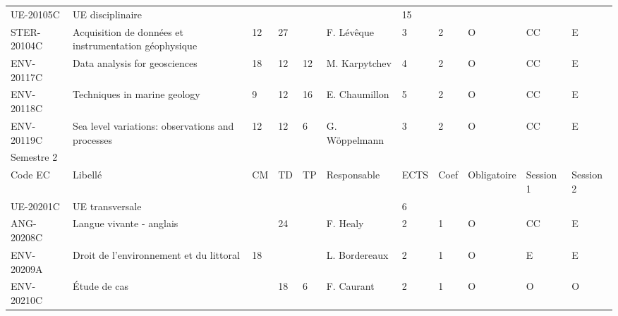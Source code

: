 \documentclass[a4paper,11pt]{article}
\begin{document}
{{\begin{tabular}{lllllllllll}
\rowcolor[HTML]{C0C0C0} 
UE-20105C     & UE disciplinaire                                                                              &    &    &    &                 & 15   &      &             &                &           \\
STER-20104C   & Acquisition de données et instrumentation géophysique                                         & 12 & 27 &    & F. Lévêque      & 3    & 2    & O           & CC             & E         \\
ENV-20117C    & Data analysis for geosciences                                                                 & 18 & 12 & 12 & M. Karpytchev   & 4    & 2    & O           & CC             & E         \\
ENV-20118C    & Techniques in marine geology                                                                  & 9  & 12 & 16 & E. Chaumillon   & 5    & 2    & O           & CC             & E         \\
ENV-20119C    & Sea level variations: observations and processes                                              & 12 & 12 & 6  & G. Wöppelmann   & 3    & 2    & O           & CC             & E         \\
\rowcolor[HTML]{656565} 
Semestre 2    &                                                                                               &    &    &    &                 &      &      &             &                &           \\
\rowcolor[HTML]{9B9B9B} 
Code EC       & Libellé                                                                                       & CM & TD & TP & Responsable     & ECTS & Coef & Obligatoire & Session 1      & Session 2 \\
\rowcolor[HTML]{C0C0C0} 
UE-20201C     & UE transversale                                                                               &    &    &    &                 & 6    &      &             &                &           \\
ANG-20208C    & Langue vivante - anglais                                                                      &    & 24 &    & F. Healy        & 2    & 1    & O           & CC             & E         \\
ENV-20209A    & Droit de l'environnement et du littoral                                                       & 18 &    &    & L. Bordereaux   & 2    & 1    & O           & E              & E         \\
ENV-20210C    & Étude de cas                                                                                  &    & 18 & 6  & F. Caurant      & 2    & 1    & O           & O              & O         \\

\end{tabular}}}
\end{document}
